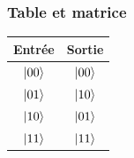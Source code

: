 \subsubsection{Table et matrice}

\begin{center}
\renewcommand{\arraystretch}{1.3}
\begin{tabular}{@{}cc@{}}
\toprule
Entrée & Sortie \\
\midrule
$|00\rangle$ & $|00\rangle$ \\
$|01\rangle$ & $|10\rangle$ \\
$|10\rangle$ & $|01\rangle$ \\
$|11\rangle$ & $|11\rangle$ \\
\bottomrule
\end{tabular}
\end{center}

